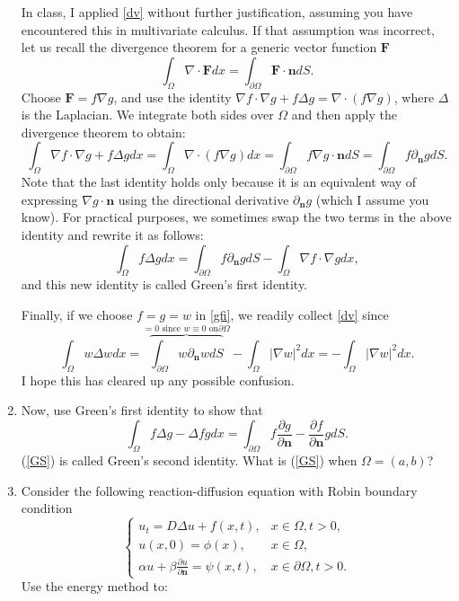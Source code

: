 \documentclass[6pt]{article}
\numberwithin{equation}{section}
\begin{document}
\begin{enumerate}
In class, I applied \eqref{dv} without further justification, assuming you have encountered this in multivariate calculus. If that assumption was incorrect, let us recall the divergence theorem for a generic vector function \( \textbf{F} \)
\[\int_\Omega \nabla \cdot \textbf{F}dx = \int_{\partial \Omega} \textbf{F}\cdot \textbf{n} dS.\] 
Choose \( \textbf{F} = f \nabla g \), and use the identity \( \nabla f \cdot \nabla g + f \Delta g = \nabla \cdot (f \nabla g) \), where \( \Delta \) is the Laplacian.  We integrate both sides over \( \Omega \) and then apply the divergence theorem to obtain:
\[\int_\Omega \nabla f\cdot \nabla g+f\Delta gdx = \int_\Omega \nabla \cdot (f\nabla g) dx = \int_{\partial\Omega}  f\nabla g \cdot \textbf{n}dS = \int_{\partial\Omega}  f\partial_\textbf{n}g dS.\]
Note that the last identity holds only because it is an equivalent way of expressing \( \nabla g \cdot \textbf{n} \) using the directional derivative \( \partial_\textbf{n} g \) (which I assume you know). For practical purposes, we sometimes swap the two terms in the above identity and rewrite it as follows:
\begin{equation}\label{gfi}
\int_\Omega f\Delta gdx = \int_{\partial\Omega}  f\partial_\textbf{n}g dS - \int_\Omega \nabla f\cdot \nabla g dx,    
\end{equation}
and this new identity is called Green's first identity.  

Finally, if we choose $f=g=w$ in \eqref{gfi}, we readily collect \eqref{dv} since 
\[\int_\Omega w\Delta wdx = \overbrace{\int_{\partial\Omega}  w\partial_\textbf{n}w dS}^{=0 \text{~since $w\equiv 0$ on} \partial \Omega} - \int_\Omega |\nabla w|^2 dx=- \int_\Omega |\nabla w|^2 dx.\]
I hope this has cleared up any possible confusion.


\item 

Now, use Green's first identity to show that
 \begin{equation}\label{GS}
\int_\Omega f \Delta g - \Delta f  gdx =\int_{\partial \Omega} f \frac{\partial g}{\partial \textbf{n}}-\frac{\partial f}{\partial \textbf{n}} gdS.
\end{equation}
(\ref{GS}) is called Green's second identity.  What is (\ref{GS}) when $\Omega=(a,b)$?
 


\item Consider the following reaction-diffusion equation with Robin boundary condition
\begin{equation}\label{1}
\left\{
\begin{array}{ll}
u_t=D\Delta u+f(x,t),&x\in \Omega,t>0,\\
u(x,0)=\phi(x),&x\in \Omega,\\
\alpha u+\beta \frac{\partial u}{\partial \textbf{n}}=\psi(x,t),&x \in \partial \Omega, t>0.
\end{array}
\right.
\end{equation}
Use the energy method to:


\end{enumerate}
\end{document}
